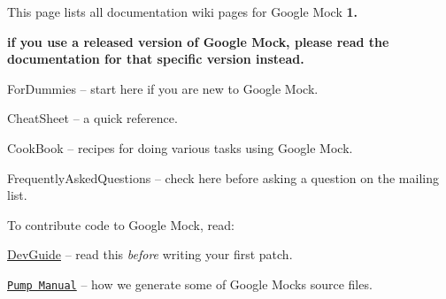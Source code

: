 This page lists all documentation wiki pages for Google Mock {\bfseries 1.}
\begin{DoxyItemize}
\item {\bfseries if you use a released version of Google Mock, please read the documentation for that specific version instead.}
\begin{DoxyItemize}
\item For\+Dummies -- start here if you are new to Google Mock.
\item Cheat\+Sheet -- a quick reference.
\item Cook\+Book -- recipes for doing various tasks using Google Mock.
\item Frequently\+Asked\+Questions -- check here before asking a question on the mailing list.
\end{DoxyItemize}
\end{DoxyItemize}

To contribute code to Google Mock, read\+:


\begin{DoxyItemize}
\item \hyperlink{googletest_2docs_2DevGuide_8md}{Dev\+Guide} -- read this {\itshape before} writing your first patch.
\item \href{http://code.google.com/p/googletest/wiki/V1_6_PumpManual}{\tt Pump Manual} -- how we generate some of Google Mock\textquotesingle{}s source files. 
\end{DoxyItemize}